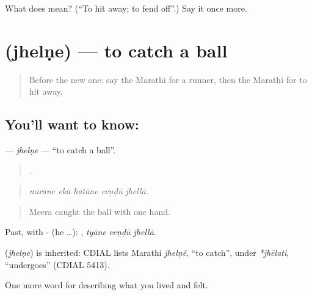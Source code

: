 \begin{tcolorbox}[breakable,colback=teal!4,colframe=teal!35!black,title={Before you move on}]
What does  mean? (\textquotedblleft{}To hit away; to fend off\textquotedblright{}.) Say it once more.
\end{tcolorbox}
\section[\texorpdfstring{\mr{झेलणे} (jhelṇe)}{झेलणे (jhelṇe)}]{ (jhelṇe) — to catch a ball}

\label{lesson:MR-C531-jhelne}



\begin{quote}
Before the new one: say the Marathi for a runner, then the Marathi for to hit away.
\end{quote}

\subsection*{You'll want to know: }
\textbf{} — \emph{jhelṇe} — \textquotedblleft{}to catch a ball\textquotedblright{}.

\begin{quote}
    .
\end{quote}

\begin{quote}
\emph{mīrāne ekā hātāne ceṇḍū jhellā.}
\end{quote}

\begin{quote}
Meera caught the ball with one hand.
\end{quote}

Past, with - (he …):   , \emph{tyāne ceṇḍū jhellā}.

\begin{cousinweb}
\textbf{} (\emph{jhelṇe}) is inherited: CDIAL lists Marathi \emph{jhelṇẽ}, \textquotedblleft{}to catch\textquotedblright{}, under \emph{*jhēlati}, \textquotedblleft{}undergoes\textquotedblright{} (CDIAL 5413).
\end{cousinweb}

\begin{grammarlens}[title={What you've built}]
One more word for describing what you lived and felt.
\end{grammarlens}

